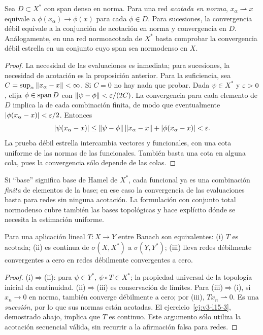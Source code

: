 \begin{proposicion}\label{v3:total-debil}
Sea $D\subset X^*$ con span denso en norma. Para una red \emph{acotada en norma}, $x_\alpha\rightharpoonup x$ equivale a $\phi(x_\alpha)\to\phi(x)$ para cada $\phi\in D$. Para sucesiones, la convergencia débil equivale a la conjunción de acotación en norma y convergencia en $D$. Análogamente, en una red normoacotada de $X^*$ basta comprobar la convergencia débil estrella en un conjunto cuyo span sea normodenso en $X$.
\end{proposicion}
\begin{proof}
La necesidad de las evaluaciones es inmediata; para sucesiones, la necesidad de acotación es la proposición anterior. Para la suficiencia, sea $C=\sup_\alpha\left\lVert x_\alpha-x\right\rVert<\infty$. Si $C=0$ no hay nada que probar. Dada $\psi\in X^*$ y $\varepsilon>0$, elija $\phi\in\operatorname{span} D$ con $\left\lVert\psi-\phi\right\rVert<\varepsilon/(2C)$. La convergencia para cada elemento de $D$ implica la de cada combinación finita, de modo que eventualmente $|\phi(x_\alpha-x)|<\varepsilon/2$. Entonces
\[|\psi(x_\alpha-x)|\le\left\lVert\psi-\phi\right\rVert\left\lVert x_\alpha-x\right\rVert+|\phi(x_\alpha-x)|<\varepsilon.
\]
La prueba débil estrella intercambia vectores y funcionales, con una cota uniforme de las normas de las funcionales. También basta una cota en alguna cola, pues la convergencia sólo depende de las colas.
\end{proof}
Si ``base'' significa base de Hamel de $X^*$, cada funcional ya es una combinación \emph{finita} de elementos de la base; en ese caso la convergencia de las evaluaciones basta para redes sin ninguna acotación. La formulación con conjunto total normodenso cubre también las bases topológicas y hace explícito dónde se necesita la estimación uniforme.

\begin{proposicion}\label{v3:operador-debil-continuo}
Para una aplicación lineal $T:X\to Y$ entre Banach son equivalentes: (i) $T$ es acotada; (ii) es continua de $\sigma(X,X^*)$ a $\sigma(Y,Y^*)$; (iii) lleva redes débilmente convergentes a cero en redes débilmente convergentes a cero.
\end{proposicion}
\begin{proof}
(i)$\Rightarrow$(ii): para $\psi\in Y^*$, $\psi\circ T\in X^*$; la propiedad universal de la topología inicial da continuidad. (ii)$\Rightarrow$(iii) es conservación de límites. Para (iii)$\Rightarrow$(i), si $x_n\to0$ en norma, también converge débilmente a cero; por (iii), $Tx_n\rightharpoonup0$. Es una \emph{sucesión}, por lo que sus normas están acotadas. El ejercicio~\ref{ej:v3-l15-3}, demostrado abajo, implica que $T$ es continuo. Este argumento sólo utiliza la acotación secuencial válida, sin recurrir a la afirmación falsa para redes.
\end{proof}

